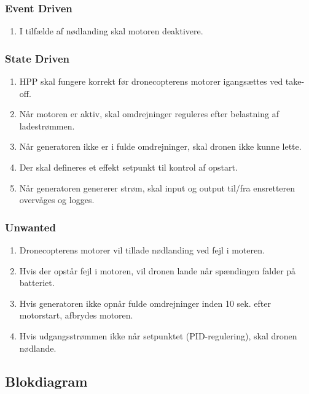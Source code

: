 \subsubsection{Event Driven}
\label{sec:kravspecifikation-2}

\begin{enumerate}[label=2.1.2.\arabic*]
\item I tilfælde af nødlanding skal motoren deaktivere. 
\end{enumerate}

\subsubsection{State Driven}
\label{sec:kravspecifikation-3}

\begin{enumerate}[label=2.1.3.\arabic*]
\item HPP skal fungere korrekt før dronecopterens motorer igangsættes ved take-off.
\item Når motoren er aktiv, skal omdrejninger reguleres efter belastning af ladestrømmen.
\item Når generatoren ikke er i fulde omdrejninger, skal dronen ikke kunne lette.
\item Der skal defineres et effekt setpunkt til kontrol af opstart.
\item Når generatoren genererer strøm, skal input og output til/fra ensretteren overvåges og logges.
\end{enumerate}

\subsubsection{Unwanted}
\label{sec:kravspecifikation-4}

\begin{enumerate}[label=2.1.4.\arabic*]
\item Dronecopterens motorer vil tillade nødlanding ved fejl i moteren.
\item Hvis der opstår fejl i motoren, vil dronen lande når spændingen falder på batteriet.
\item Hvis generatoren ikke opnår fulde omdrejninger inden 10 sek. efter motorstart, afbrydes motoren.
\item Hvis udgangsstrømmen ikke når setpunktet (PID-regulering), skal dronen nødlande.
\end{enumerate}

\subsection{Blokdiagram}
\label{sec:blokdiagram-}

